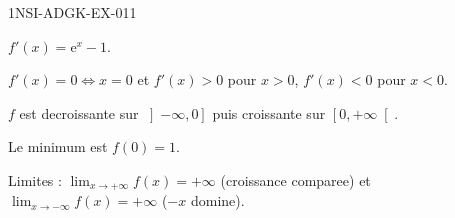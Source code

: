 \begin{corrige}{1NSI-ADGK-EX-011}

$f'(x) = \mathrm{e}^x - 1$.


$f'(x) = 0 \iff x = 0$ et $f'(x) > 0$ pour $x > 0$, $f'(x) < 0$ pour $x < 0$.

$f$ est decroissante sur $\left]-\infty, 0\right]$ puis croissante sur $\left[0, +\infty\right[$.

Le minimum est $f(0) = 1$.

Limites : $\lim_{x \to +\infty} f(x) = +\infty$ (croissance comparee) et $\lim_{x \to -\infty} f(x) = +\infty$ ($-x$ domine).

\end{corrige}

